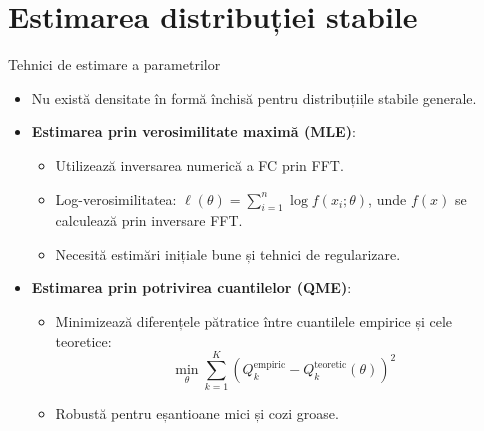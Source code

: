 \documentclass[9pt, aspectratio=169, t]{beamer}
\theoremstyle{definition}
\begin{document}
\section{Estimarea distribuției stabile}

\begin{frame}{Tehnici de estimare a parametrilor}
\begin{itemize}
    \item Nu există densitate în formă închisă pentru distribuțiile stabile generale.
    \item \textbf{Estimarea prin verosimilitate maximă (MLE)}:
    \begin{itemize}
        \item Utilizează inversarea numerică a FC prin FFT.
        \item Log-verosimilitatea: $\ell(\theta) = \sum_{i=1}^n \log f(x_i; \theta)$, unde $f(x)$ se calculează prin inversare FFT.
        \item Necesită estimări inițiale bune și tehnici de regularizare.
    \end{itemize}
    \item \textbf{Estimarea prin potrivirea cuantilelor (QME)}:
    \begin{itemize}
        \item Minimizează diferențele pătratice între cuantilele empirice și cele teoretice:
        \[
            \min_\theta \sum_{k=1}^K \left(Q_k^{\text{empiric}} - Q_k^{\text{teoretic}}(\theta)\right)^2
        \]
        \item Robustă pentru eșantioane mici și cozi groase.
    \end{itemize}
\end{itemize}
\end{frame}
\end{document}
